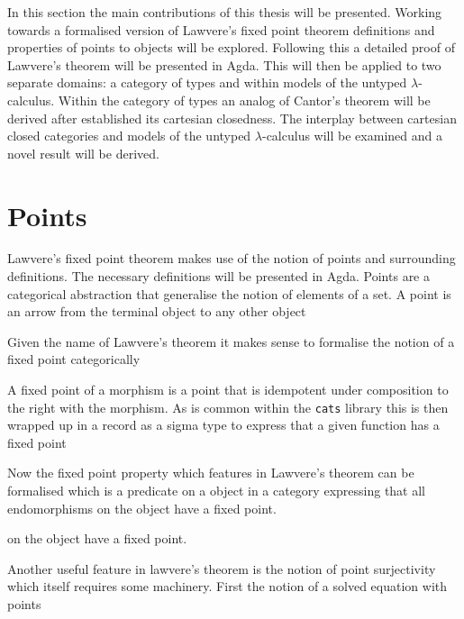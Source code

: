 In this section the main contributions of this thesis will be presented. Working
towards a formalised version of Lawvere's fixed point theorem definitions and
properties of points to objects will be explored. Following this a detailed
proof of Lawvere's theorem will be presented in Agda. This will then be applied
to two separate domains: a category of types and within models of the untyped
$\lambda$-calculus. Within the category of types an analog of Cantor's theorem
will be derived after established its cartesian closedness. The interplay
between cartesian closed categories and models of the untyped $\lambda$-calculus
will be examined and a novel result will be derived.
\section{Points}
Lawvere's fixed point theorem makes use of the notion of points and surrounding
definitions. The necessary definitions will be presented in Agda. Points are a
categorical abstraction that generalise the notion of elements of a set. A point
is an arrow from the terminal object to any other object


Given the name of Lawvere's theorem it makes sense to formalise the notion of a
fixed point categorically


A fixed point of a morphism is a point that is idempotent under composition to
the right with the morphism. As is common within the \verb|cats| library this is
then wrapped up in a record as a sigma type to express that a given function has
a fixed point


Now the fixed point property which features in Lawvere's theorem can be
formalised which is a predicate on a object in a category expressing that all
endomorphisms on the object have a fixed point.

 on the object have a fixed point.

Another useful feature in lawvere's theorem is the notion of point surjectivity
which itself requires some machinery. First the notion of a solved equation with
points

